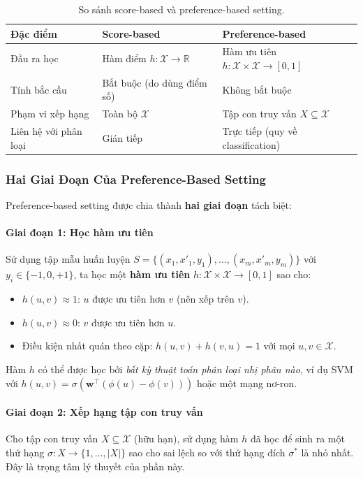 \begin{table}[h]
\centering
\small
\begin{tabular}{lll}
\hline
\textbf{Đặc điểm} & \textbf{Score-based} & \textbf{Preference-based} \\
\hline
Đầu ra học & Hàm điểm $h:\mathcal{X}\to\mathbb{R}$ & Hàm ưu tiên $h:\mathcal{X}\times\mathcal{X}\to[0,1]$ \\
Tính bắc cầu & Bắt buộc (do dùng điểm số) & Không bắt buộc \\
Phạm vi xếp hạng & Toàn bộ $\mathcal{X}$ & Tập con truy vấn $X \subseteq \mathcal{X}$ \\
Liên hệ với phân loại & Gián tiếp & Trực tiếp (quy về classification) \\
\hline
\end{tabular}
\caption{So sánh score-based và preference-based setting.}
\label{tab:pref_vs_score}
\end{table}

\subsubsection{Hai Giai Đoạn Của Preference-Based Setting}

Preference-based setting được chia thành \textbf{hai giai đoạn} tách biệt:

\paragraph{Giai đoạn 1: Học hàm ưu tiên}
Sử dụng tập mẫu huấn luyện $S = \{(x_1, x'_1, y_1), \ldots, (x_m, x'_m, y_m)\}$ với $y_i \in \{-1, 0, +1\}$, ta học một \textbf{hàm ưu tiên} $h : \mathcal{X} \times \mathcal{X} \to [0,1]$ sao cho:
\begin{itemize}
    \item $h(u, v) \approx 1$: $u$ được ưu tiên hơn $v$ (nên xếp trên $v$).
    \item $h(u, v) \approx 0$: $v$ được ưu tiên hơn $u$.
    \item Điều kiện nhất quán theo cặp: $h(u,v) + h(v,u) = 1$ với mọi $u, v \in \mathcal{X}$.
\end{itemize}

Hàm $h$ có thể được học bởi \emph{bất kỳ thuật toán phân loại nhị phân nào}, ví dụ SVM với $h(u,v) = \sigma(\mathbf{w}^\top(\phi(u) - \phi(v)))$ hoặc một mạng nơ-ron.

\paragraph{Giai đoạn 2: Xếp hạng tập con truy vấn}
Cho tập con truy vấn $X \subseteq \mathcal{X}$ (hữu hạn), sử dụng hàm $h$ đã học để sinh ra một thứ hạng $\sigma: X \to \{1, \ldots, |X|\}$ sao cho sai lệch so với thứ hạng đích $\sigma^*$ là nhỏ nhất. Đây là trọng tâm lý thuyết của phần này.


